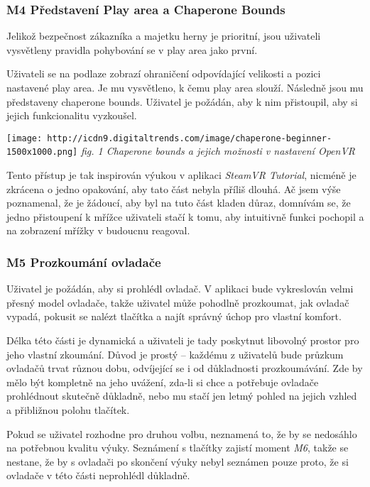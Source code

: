 \subsubsection{M4 Představení Play area a Chaperone
Bounds}\label{m4-pux159edstavenuxed-play-area-a-chaperone-bounds}

Jelikož bezpečnost zákazníka a majetku herny je prioritní, jsou
uživateli vysvětleny pravidla pohybování se v play area jako první.

Uživateli se na podlaze zobrazí ohraničení odpovídající velikosti a
pozici nastavené play area. Je mu vysvětleno, k čemu play area slouží.
Následně jsou mu představeny chaperone bounds. Uživatel je požádán, aby
k nim přistoupil, aby si jejich funkcionalitu vyzkoušel.

\texttt{[image: http://icdn9.digitaltrends.com/image/chaperone-beginner-1500x1000.png]}
\emph{fig. 1 Chaperone bounds a jejich možnosti v nastavení OpenVR}

Tento přístup je tak inspirován výukou v aplikaci \emph{SteamVR
Tutorial}, nicméně je zkrácena o jedno opakování, aby tato část nebyla
příliš dlouhá. Ač jsem výše poznamenal, že je žádoucí, aby byl na tuto
část kladen důraz, domnívám se, že jedno přistoupení k mřížce uživateli
stačí k tomu, aby intuitivně funkci pochopil a na zobrazení mřížky v
budoucnu reagoval.

\subsubsection{M5 Prozkoumání
ovladače}\label{m5-prozkoumuxe1nuxed-ovladaux10de}

Uživatel je požádán, aby si prohlédl ovladač. V aplikaci bude
vykreslován velmi přesný model ovladače, takže uživatel může pohodlně
prozkoumat, jak ovladač vypadá, pokusit se nalézt tlačítka a najít
správný úchop pro vlastní komfort.

Délka této části je dynamická a uživateli je tady poskytnut libovolný
prostor pro jeho vlastní zkoumání. Důvod je prostý -- každému z
uživatelů bude průzkum ovladačů trvat různou dobu, odvíjející se i od
důkladnosti prozkoumávání. Zde by mělo být kompletně na jeho uvážení,
zda-li si chce a potřebuje ovladače prohlédnout skutečně důkladně, nebo
mu stačí jen letmý pohled na jejich vzhled a přibližnou polohu tlačítek.

Pokud se uživatel rozhodne pro druhou volbu, neznamená to, že by se
nedosáhlo na potřebnou kvalitu výuky. Seznámení s tlačítky zajistí
moment \emph{M6}, takže se nestane, že by s ovladači po skončení výuky
nebyl seznámen pouze proto, že si ovladače v této části neprohlédl
důkladně.

